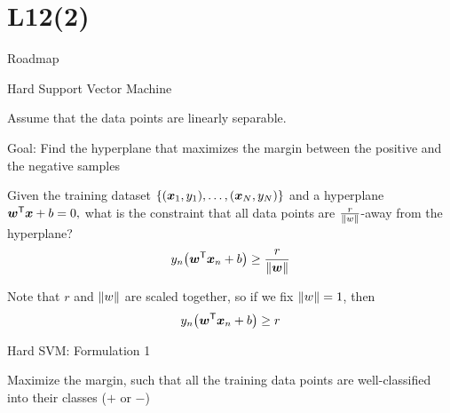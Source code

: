 \documentclass[handout,fleqn,aspectratio=169]{beamer}
\begin{document}
\section{L12(2)}
\begin{frame}{Roadmap}

\plitemsep 0.1in

\bce[(1)] 

\item {}
\item {} 
\item {} 

\ece
\end{frame}

\begin{frame}{Hard Support Vector Machine}

\plitemsep 0.07in

\bci

\item Assume that the data points are linearly separable.

\item Goal: Find the hyperplane that maximizes the margin between the positive and the negative samples

\item Given the training dataset $\{(\bm{x}_1,y_1), \ldots, (\bm{x}_N,y_N) \}$ 
and a hyperplane ${\bm{w}}^{\mathsf{T}}\bm{x} + b =0,$ what is the constraint that all data points are $\frac{r}{\left \lVert w \right \rVert}$-away from the hyperplane?
$$
y_n \big({\bm{w}}^{\mathsf{T}}\bm{x}_n +b \big) \geq \frac{r}{\left \lVert \bm{w} \right \rVert}
$$

\item Note that $r$ and $\left \lVert w \right \rVert$ are scaled together, so if we fix $\left \lVert w \right \rVert=1$, then 
$$
y_n \big({\bm{w}}^{\mathsf{T}}\bm{x}_n +b \big) \geq r
$$

\eci
\end{frame}

\begin{frame}{Hard SVM: Formulation 1}

\plitemsep 0.07in

\bci

\item Maximize the margin, such that all the training data points are well-classified into their classes ($+$ or $-$)
\mycolorbox
{
\vspace{-0.3cm}
}

\eci
\end{frame}
\end{document}
